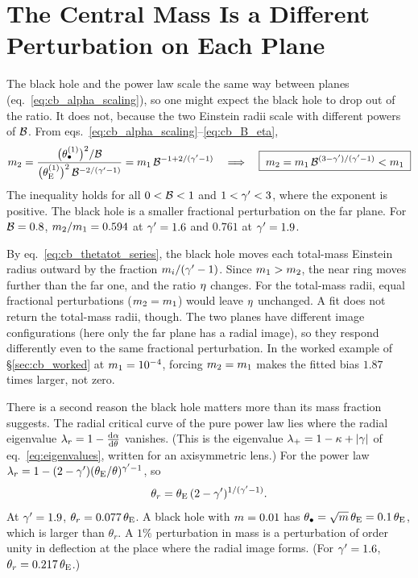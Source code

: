 \section{The Central Mass Is a Different Perturbation on Each Plane}
\label{sec:cb_differential}

The black hole and the power law scale the same way between planes
(eq.~\eqref{eq:cb_alpha_scaling}), so one might expect the black hole to
drop out of the ratio. It does not, because the two Einstein radii
scale with different powers of $\mathcal{B}$. From
eqs.~\eqref{eq:cb_alpha_scaling}--\eqref{eq:cb_B_eta},
\begin{equation}
  m_2
  = \frac{\big(\theta_{\bullet}^{(1)}\big)^2/\mathcal{B}}{\big(\theta_{\mathrm{E}}^{(1)}\big)^2\,\mathcal{B}^{-2/(\gamma'-1)}}
  = m_1\,\mathcal{B}^{-1+2/(\gamma'-1)}
  \quad\Longrightarrow\quad
  \boxed{\;m_2 = m_1\,\mathcal{B}^{(3-\gamma')/(\gamma'-1)} < m_1\;}
  \label{eq:cb_m2_m1}
\end{equation}
The inequality holds for all $0<\mathcal{B}<1$ and $1<\gamma'<3$, where the
exponent is positive. The black hole is a smaller fractional
perturbation on the far plane. For $\mathcal{B}=0.8$, $m_2/m_1 = 0.594$
at $\gamma'=1.6$ and $0.761$ at $\gamma'=1.9$. 

\begin{keybox}
By eq.~\eqref{eq:cb_thetatot_series}, the black hole moves each
total-mass Einstein radius outward by the fraction $m_i/(\gamma'-1)$.
Since $m_1>m_2$, the near ring moves further than the far one, and
the ratio $\eta$ changes. For the total-mass radii, equal fractional
perturbations ($m_2=m_1$) would leave $\eta$ unchanged. A fit
does not return the total-mass radii, though. The two planes have
different image configurations (here only the far plane has a radial
image), so they respond differently even to the same fractional
perturbation. In the worked example of \S\ref{sec:cb_worked} at
$m_1=10^{-4}$, forcing $m_2=m_1$ makes the fitted bias $1.87$
times larger, not zero. 
\end{keybox}

There is a second reason the black hole matters more than its mass
fraction suggests. The radial critical curve of the pure power law lies
where the radial eigenvalue $\lambda_r = 1-\frac{\mathrm{d} \alpha}{\mathrm{d} \theta}$
vanishes. (This is the eigenvalue $\lambda_+=1-\kappa+|\gamma|$ of
eq.~\eqref{eq:eigenvalues}, written for an axisymmetric lens.) For the
power law $\lambda_r = 1-(2-\gamma')(\theta_{\mathrm{E}}/\theta)^{\gamma'-1}$, so
\begin{equation}
  \theta_r = \theta_{\mathrm{E}}\,(2-\gamma')^{1/(\gamma'-1)} .
  \label{eq:cb_theta_r}
\end{equation}
At $\gamma'=1.9$, $\theta_r = 0.077\,\theta_{\mathrm{E}}$. A black hole with $m=0.01$
has $\theta_{\bullet}=\sqrt{m}\,\theta_{\mathrm{E}} = 0.1\,\theta_{\mathrm{E}}$, which is
larger than $\theta_r$. A $1\%$ perturbation in mass is a
perturbation of order unity in deflection at the place where the radial
image forms. (For $\gamma'=1.6$, $\theta_r=0.217\,\theta_{\mathrm{E}}$.)

